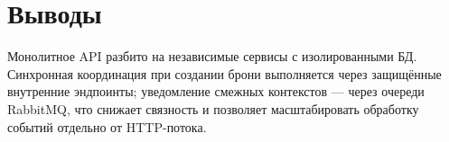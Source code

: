 \documentclass[a4paper,14pt]{extarticle}
\begin{document}
\section{Выводы}

Монолитное API разбито на независимые сервисы с изолированными БД. Синхронная координация при создании брони выполняется через защищённые внутренние эндпоинты; уведомление смежных контекстов --- через очереди RabbitMQ, что снижает связность и позволяет масштабировать обработку событий отдельно от HTTP-потока.
\end{document}
